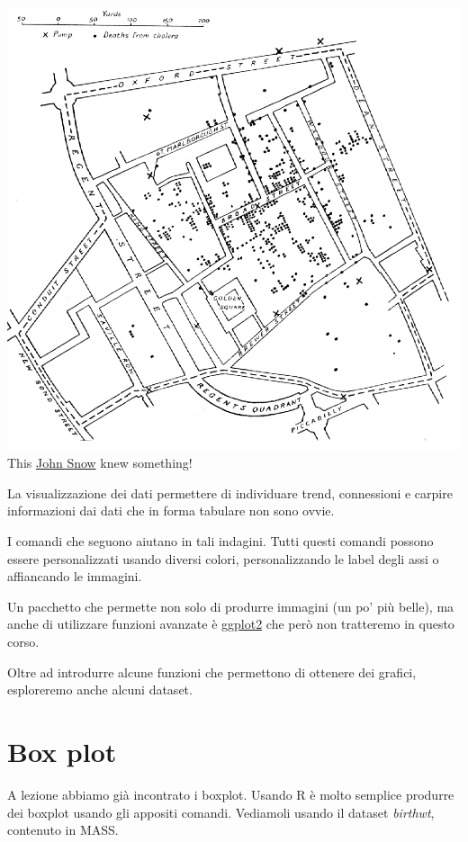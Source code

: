 \documentclass[]{book}
\begin{document}
\includegraphics{./media/Cholera.jpg}
This \href{https://it.wikipedia.org/wiki/John_Snow_(medico)}{John Snow} knew something!

La visualizzazione dei dati permettere di individuare trend, connessioni e carpire informazioni dai dati che in forma tabulare non sono ovvie.

I comandi che seguono aiutano in tali indagini. Tutti questi comandi possono essere personalizzati usando diversi colori, personalizzando le label degli assi o affiancando le immagini.

Un pacchetto che permette non solo di produrre immagini (un po' più belle), ma anche di utilizzare funzioni avanzate è \href{http://ggplot2.org/}{ggplot2} che però non tratteremo in questo corso.

Oltre ad introdurre alcune funzioni che permettono di ottenere dei grafici, esploreremo anche alcuni dataset.

\hypertarget{box-plot}{%
\section{Box plot}\label{box-plot}}

A lezione abbiamo già incontrato i boxplot. Usando R è molto semplice produrre dei boxplot usando gli appositi comandi. Vediamoli usando il dataset \emph{birthwt}, contenuto in MASS.
\end{document}
